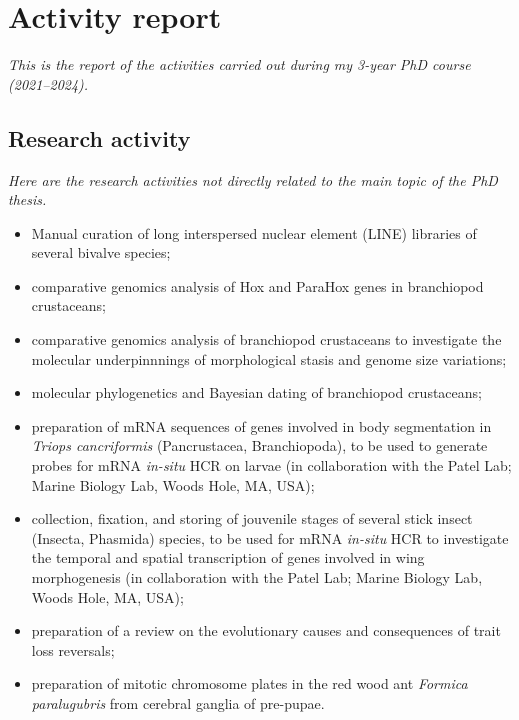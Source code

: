 {
\chapter*{Activity report}
\label{activityreport}
}

\setcounter{page}{1}

\small{\textit{This is the report of the activities carried out during my 3-year PhD course (2021--2024).}}

\section*{Research activity}
\small{\textit{Here are the research activities not directly related to the main topic of the PhD thesis.}}
\begin{itemize}
    \item Manual curation of long interspersed nuclear element (LINE) libraries of several bivalve species;
    \item comparative genomics analysis of Hox and ParaHox genes in branchiopod crustaceans;
    \item comparative genomics analysis of branchiopod crustaceans to investigate the molecular underpinnnings of morphological stasis and genome size variations;
    \item molecular phylogenetics and Bayesian dating of branchiopod crustaceans;
    \item preparation of mRNA sequences of genes involved in body segmentation in \textit{Triops cancriformis} (Pancrustacea, Branchiopoda), to be used to generate probes for mRNA \textit{in-situ} HCR on larvae (in collaboration with the Patel Lab; Marine Biology Lab, Woods Hole, MA, USA);
    \item collection, fixation, and storing of jouvenile stages of several stick insect (Insecta, Phasmida) species, to be used for mRNA \textit{in-situ} HCR to investigate the temporal and spatial transcription of genes involved in wing morphogenesis (in collaboration with the Patel Lab; Marine Biology Lab, Woods Hole, MA, USA);
    \item preparation of a review on the evolutionary causes and consequences of trait loss reversals;
    \item preparation of mitotic chromosome plates in the red wood ant \textit{Formica paralugubris} from cerebral ganglia of pre-pupae.

\end{itemize}

